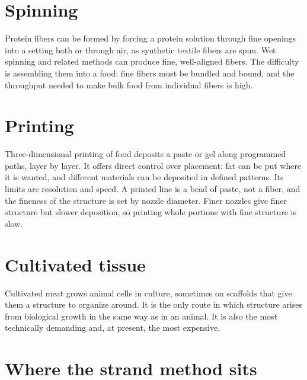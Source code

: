 \documentclass[11pt,openany]{book}
\theoremstyle{definition}
\begin{document}
\section{Spinning}

Protein fibers can be formed by forcing a protein solution through fine openings into a setting bath or through air, as synthetic textile fibers are spun. Wet spinning and related methods can produce fine, well-aligned fibers. The difficulty is assembling them into a food: fine fibers must be bundled and bound, and the throughput needed to make bulk food from individual fibers is high.

\section{Printing}

Three-dimensional printing of food deposits a paste or gel along programmed paths, layer by layer. It offers direct control over placement: fat can be put where it is wanted, and different materials can be deposited in defined patterns. Its limits are resolution and speed. A printed line is a bead of paste, not a fiber, and the fineness of the structure is set by nozzle diameter. Finer nozzles give finer structure but slower deposition, so printing whole portions with fine structure is slow.

\section{Cultivated tissue}

Cultivated meat grows animal cells in culture, sometimes on scaffolds that give them a structure to organize around. It is the only route in which structure arises from biological growth in the same way as in an animal. It is also the most technically demanding and, at present, the most expensive.

\section{Where the strand method sits}
\end{document}
